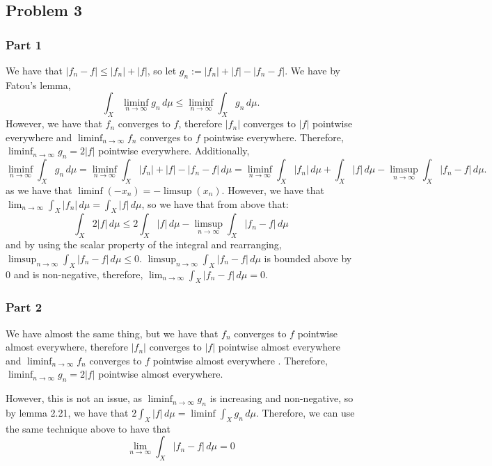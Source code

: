 \documentclass{article}
\theoremstyle{definition}
\numberwithin{theorem}{section}
\numberwithin{equation}{section}
\newcommand{\intd}{\, d}
\begin{document}
\subsection{Problem 3}
\subsubsection{Part 1}
We have that $|f_n - f| \leq |f_n| + |f|$, so let $g_n := |f_n| + |f| - |f_n - f|$. We have by Fatou's lemma,
\begin{equation}
	\int_X \liminf_{n \rightarrow \infty} g_n \intd \mu \leq \liminf_{n \rightarrow \infty} \int_X g_n \intd \mu.
\end{equation}
However, we have that $f_n$ converges to $f$, therefore $|f_n|$ converges to $|f|$ pointwise everywhere and  $\liminf_{n \rightarrow \infty} f_n$ converges to $f$ pointwise everywhere. Therefore, $\liminf_{n \rightarrow \infty} g_n = 2 |f|$ pointwise everywhere. Additionally, 
\begin{equation}
	\liminf_{n \rightarrow \infty} \int_X g_n \intd \mu = \liminf_{n \rightarrow \infty} \int_X |f_n| + |f| - |f_n - f| \intd \mu = \liminf_{n \rightarrow \infty} \int_X |f_n| \intd \mu + \int_X |f| \intd \mu - 
	\limsup_{n \rightarrow \infty} \int_X |f_n - f| \intd \mu.
\end{equation}
as we have that $\liminf(-x_n) = - \limsup (x_n)$. 
However, we have that $\lim_{n \rightarrow \infty} \int_X |f_n| \intd \mu = \int_X |f| \intd \mu$, so we have that from above that:
\begin{equation}
	\int_X 2 |f| \intd \mu \leq 2 \int_X |f| \intd \mu -  \limsup_{n \rightarrow \infty} \int_X |f_n - f| \intd \mu
\end{equation}
and by using the scalar property of the integral and rearranging,
 $\limsup_{n \rightarrow \infty} \int_X |f_n - f| \intd \mu \leq 0$. $\limsup_{n \rightarrow \infty} \int_X |f_n - f| \intd \mu$ is bounded above by $0$ and is non-negative, therefore, $\lim_{n \rightarrow \infty} \int_X |f_n - f| \intd \mu = 0$. 
\subsubsection{Part 2}
We have almost the same thing, but we have that
$f_n$ converges to $f$ pointwise almost everywhere, therefore $|f_n|$ converges to $|f|$ pointwise almost everywhere and  $\liminf_{n \rightarrow \infty} f_n$ converges to $f$ pointwise almost everywhere . Therefore, $\liminf_{n \rightarrow \infty} g_n = 2 |f|$ pointwise almost everywhere.

However, this is not an issue, as $\liminf_{n \rightarrow \infty} g_n$ is increasing and non-negative, so by lemma 2.21, we have that $2 \int_X |f| \intd \mu = \liminf \int_X g_n \intd \mu$. Therefore, we can use the same technique above to have that
\begin{equation}
	\lim_{n \rightarrow \infty} \int_X |f_n - f| \intd \mu = 0
\end{equation}
\end{document}
